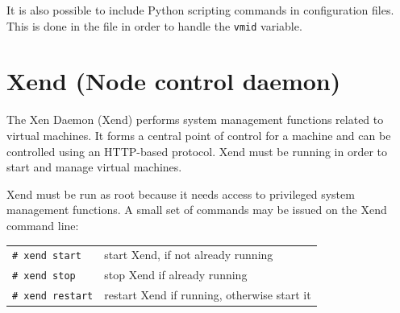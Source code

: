 \documentclass[11pt,twoside,final,openright]{xenstyle}
\begin{document}
It is also possible to include Python scripting commands in
configuration files.  This is done in the  file in
order to handle the {\tt vmid} variable.


\chapter{Xend (Node control daemon)}
\label{cha:xensv}

The Xen Daemon (Xend) performs system management functions related to
virtual machines.  It forms a central point of control for a machine
and can be controlled using an HTTP-based protocol.  Xend must be
running in order to start and manage virtual machines.

Xend must be run as root because it needs access to privileged system
management functions.  A small set of commands may be issued on the
Xend command line:

\begin{tabular}{ll}
\verb_# xend start_ & start Xend, if not already running \\
\verb_# xend stop_  & stop Xend if already running       \\
\verb_# xend restart_ & restart Xend if running, otherwise start it \\
\end{tabular}
\end{document}
